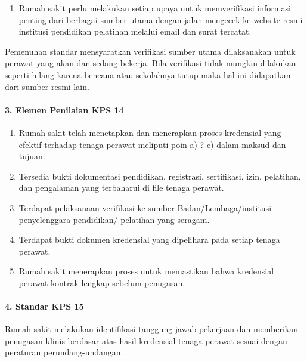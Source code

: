 \documentclass[
]{book}
\providecommand{\tightlist}{%
  \setlength{\itemsep}{0pt}\setlength{\parskip}{0pt}}
\begin{document}
\begin{enumerate}
\def\labelenumi{\alph{enumi}.}
\setcounter{enumi}{2}
\tightlist
\item
  Rumah sakit perlu melakukan setiap upaya untuk memverifikasi informasi penting dari berbagai sumber utama dengan jalan mengecek ke website resmi institusi pendidikan pelatihan melalui email dan surat tercatat.
\end{enumerate}

Pemenuhan standar mensyaratkan verifikasi sumber utama dilaksanakan untuk perawat yang akan dan sedang bekerja. Bila verifikasi tidak mungkin dilakukan seperti hilang karena bencana atau sekolahnya tutup maka hal ini didapatkan dari sumber resmi lain.

\hypertarget{elemen-penilaian-kps-14}{%
\paragraph*{3. Elemen Penilaian KPS 14}\label{elemen-penilaian-kps-14}}

\begin{enumerate}
\def\labelenumi{\alph{enumi}.}
\tightlist
\item
  Rumah sakit telah menetapkan dan menerapkan proses kredensial yang efektif terhadap tenaga perawat meliputi poin a) ? c) dalam maksud dan tujuan.
\item
  Tersedia bukti dokumentasi pendidikan, registrasi, sertifikasi, izin, pelatihan, dan pengalaman yang terbaharui di file tenaga perawat.
\item
  Terdapat pelaksanaan verifikasi ke sumber Badan/Lembaga/institusi penyelenggara pendidikan/ pelatihan yang seragam.
\item
  Terdapat bukti dokumen kredensial yang dipelihara pada setiap tenaga perawat.
\item
  Rumah sakit menerapkan proses untuk memastikan bahwa kredensial perawat kontrak lengkap sebelum penugasan.
\end{enumerate}

\hypertarget{standar-kps-15}{%
\paragraph*{4. Standar KPS 15}\label{standar-kps-15}}

Rumah sakit melakukan identifikasi tanggung jawab pekerjaan dan memberikan penugasan klinis berdasar atas hasil kredensial tenaga perawat sesuai dengan peraturan perundang-undangan.
\end{document}
